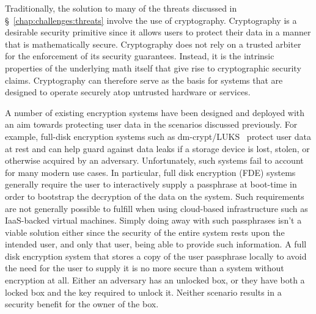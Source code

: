 Traditionally, the solution to many of the threats discussed in
\S~\ref{chap:challenges:threats} involve the use of
cryptography. Cryptography is a desirable security primitive since it
allows users to protect their data in a manner that is mathematically
secure. Cryptography does not rely on a trusted arbiter for the
enforcement of its security guarantees. Instead, it is the intrinsic
properties of the underlying math itself that give rise to
cryptographic security claims. Cryptography can therefore serve as the
basis for systems that are designed to operate securely atop untrusted
hardware or services.

A number of existing encryption systems have been designed and
deployed with an aim towards protecting user data in the scenarios
discussed previously. For example, full-disk encryption systems such
as dm-crypt/LUKS~\cite{dm-crypt, luks} protect user data at rest and
can help guard against data leaks if a storage device is lost, stolen,
or otherwise acquired by an adversary. Unfortunately, such systems
fail to account for many modern use cases. In particular, full disk
encryption (FDE) systems generally require the user to interactively
supply a passphrase at boot-time in order to bootstrap the decryption
of the data on the system. Such requirements are not generally
possible to fulfill when using cloud-based infrastructure such as
IaaS-backed virtual machines. Simply doing away with such passphrases
isn't a viable solution either since the security of the entire system
rests upon the intended user, and only that user, being able to
provide such information. A full disk encryption system that stores a
copy of the user passphrase locally to avoid the need for the user to
supply it is no more secure than a system without encryption at
all. Either an adversary has an unlocked box, or they have both a
locked box and the key required to unlock it. Neither scenario results
in a security benefit for the owner of the box.

